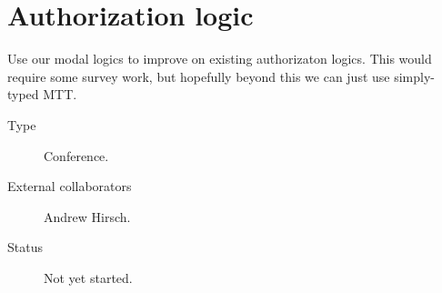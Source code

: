 \documentclass{amsart}
\begin{document}
\section*{Authorization logic}

Use our modal logics to improve on existing authorizaton logics. This would require some survey
work, but hopefully beyond this we can just use simply-typed MTT.

\begin{description}
\item[Type] Conference.
\item[External collaborators] Andrew Hirsch.
\item[Status] Not yet started.
\end{description}
\end{document}
